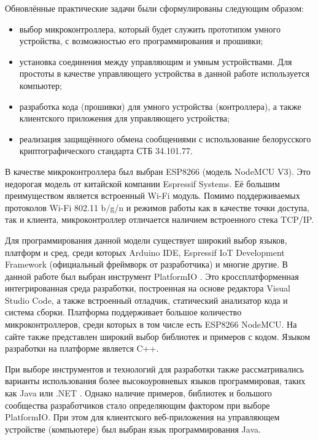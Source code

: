 	Обновлённые практические задачи были сформулированы следующим образом:
	
	\begin{itemize}
		\item выбор микроконтроллера, который будет служить прототипом умного устройства,
		с возможностью его программирования и прошивки;
		\item установка соединения между управляющим и умным устройствами. Для простоты в качестве
		управляющего устройства в данной работе используется компьютер;
		\item разработка кода (прошивки) для умного устройства (контроллера), а также клиентского
		приложения для управляющего устройства;
		\item реализация защищённого обмена сообщениями с использование белорусского криптографического
		стандарта СТБ 34.101.77.
	\end{itemize}

	В качестве микроконтроллера был выбран ESP8266 (модель NodeMCU V3). Это недорогая модель от
	китайской компании Espressif Systems. Её большим преимуществом является встроенный Wi-Fi модуль. 
	Помимо поддерживаемых протоколов Wi-Fi 802.11 b/g/n и режимов работы как в качестве точки доступа,
	так и клиента, микроконтроллер отличается наличием встроенного стека TCP/IP.
	
	Для программирования данной модели существует широкий выбор языков, платформ и сред, среди
	которых Arduino IDE, Espressif IoT Development Framework (официальный фреймворк от разработчика)
	и многие другие. В данной работе был выбран инструмент PlatformIO \cite{platformio}. Это
	кроссплатформенная интегрированная среда разработки, построенная на основе редактора 
	Visual Studio Code, а также встроенный отладчик, статический анализатор кода и система сборки.
	Платформа поддерживает большое количество микроконтроллеров, среди которых в том числе есть
	ESP8266 NodeMCU. На сайте также представлен широкий выбор библиотек и примеров с кодом.
	Языком разработки на платформе является C++.
	
	При выборе инструментов и технологий для разработки также рассматривались варианты использования
	более высокоуровневых языков программировая, таких как Java \cite{microej} или .NET \cite{nanoFramework}.
	Однако наличие примеров, библиотек и большого сообщества разработчиков стало определяющим
	фактором при выборе PlatformIO. При этом для клиентского веб-приложения на управляющем устройстве
	(компьютере) был выбран язык программирования Java.
	
